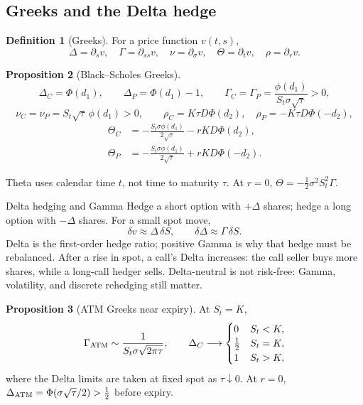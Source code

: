 \documentclass[10pt]{article}
\newcommand{\1}{\mathbf 1}
\theoremstyle{definition}
\newtheorem{definition}{Definition}[section]
\newtheorem{proposition}[definition]{Proposition}
\begin{document}
\subsection{Greeks and the Delta hedge}

\begin{definition}[Greeks]
For a price function \(v(t,s)\),
\[
\Delta=\partial_s v,\quad \Gamma=\partial_{ss}v,\quad
\nu=\partial_\sigma v,\quad \Theta=\partial_t v,\quad \rho=\partial_r v.
\]
\end{definition}

\begin{proposition}[Black--Scholes Greeks]
\[
\Delta_C=\Phi(d_1),\qquad \Delta_P=\Phi(d_1)-1,\qquad
\boxed{\Gamma_C=\Gamma_P=\frac{\phi(d_1)}{S_t\sigma\sqrt\tau}>0,}
\]
\[
\boxed{\nu_C=\nu_P=S_t\sqrt\tau\,\phi(d_1)>0,}\qquad
\rho_C=K\tau D\Phi(d_2),\quad \rho_P=-K\tau D\Phi(-d_2),
\]
\[
\begin{aligned}
\Theta_C&=-\frac{S_t\sigma\phi(d_1)}{2\sqrt\tau}-rKD\Phi(d_2),\\
\Theta_P&=-\frac{S_t\sigma\phi(d_1)}{2\sqrt\tau}+rKD\Phi(-d_2).
\end{aligned}
\]
\end{proposition}

Theta uses calendar time \(t\), not time to maturity \(\tau\). At \(r=0\),
\(\Theta=-\tfrac12\sigma^2S_t^2\Gamma\).

\begin{keyidea}{Delta hedging and Gamma}
Hedge a short option with \(+\Delta\) shares; hedge a long option with
\(-\Delta\) shares. For a small spot move,
\[
\delta v\approx\Delta\,\delta S,\qquad
\delta\Delta\approx\Gamma\,\delta S.
\]
Delta is the first-order hedge ratio; positive Gamma is why that hedge must be
rebalanced. After a rise in spot, a call's Delta increases: the call seller
buys more shares, while a long-call hedger sells. Delta-neutral is not
risk-free: Gamma, volatility, and discrete rehedging still matter.
\end{keyidea}

\begin{proposition}[ATM Greeks near expiry]
At \(S_t=K\),
\[
\Gamma_{\rm ATM}\sim\frac1{S_t\sigma\sqrt{2\pi\tau}},\qquad
\Delta_C\longrightarrow
\begin{cases}0&S_t<K,\\ \tfrac12&S_t=K,\\1&S_t>K,\end{cases}
\]
where the Delta limits are taken at fixed spot as \(\tau\downarrow0\).
At \(r=0\), \(\Delta_{\rm ATM}=\Phi(\sigma\sqrt\tau/2)>\tfrac12\) before expiry.
\end{proposition}
\end{document}
